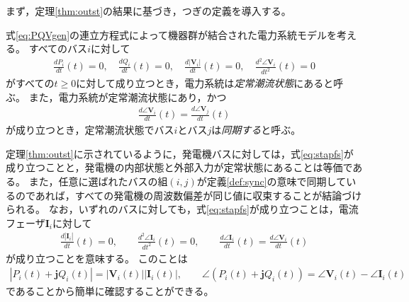 \documentclass[tombow,dvipdfmx]{corona-a5-1.1}
\begin{document}
まず，定理\ref{thm:outst}の結果に基づき，つぎの定義を導入する。

\begin{定義}[定常潮流状態とバス電圧の同期]
\label{def:sync}
式\ref{eq:PQVgen}の連立方程式によって機器群が結合された電力系統モデルを考える。
すべてのバス$i$に対して
\begin{align}\label{eq:stapfs}
\frac{dP_i}{dt}(t)=0
,\quad
\frac{dQ_i}{dt}(t)=0
,\quad
\frac{d|\bm{V}_i|}{dt}(t)=0
,\quad
\frac{d^2 \angle \bm{V}_i }{dt^2}(t)=0
\end{align}
がすべての$t\geq0$に対して成り立つとき，電力系統は\emph{定常潮流状態}にあると呼ぶ。
また，電力系統が定常潮流状態にあり，かつ
\begin{align}\label{eq:defsyn}
\frac{d \angle \bm{V}_i}{dt}(t) =  \frac{d \angle \bm{V}_j}{dt}(t)
\end{align}
が成り立つとき，定常潮流状態でバス$i$とバス$j$は\emph{同期する}と呼ぶ。
\end{定義}

定理\ref{thm:outst}に示されているように，発電機バスに対しては，式\ref{eq:stapfs}が成り立つことと，発電機の内部状態と外部入力が定常状態にあることは等価である。
また，任意に選ばれたバスの組$(i,j)$が定義\ref{def:sync}の意味で同期しているのであれば，すべての発電機の周波数偏差が同じ値に収束することが結論づけられる。
なお，いずれのバスに対しても，式\ref{eq:stapfs}が成り立つことは，電流フェーザ$\bm{I}_i$に対して
\begin{align*}
\frac{d|\bm{I}_i|}{dt}(t)=0
,\qquad
\frac{d^2 \angle \bm{I}_i }{dt^2}(t)=0
,\qquad
\frac{d \angle \bm{I}_i }{dt}(t) = \frac{d \angle \bm{V}_i }{dt} (t)
\end{align*}
が成り立つことを意味する。
このことは
\begin{align*}
|P_i(t) + \bm{j} Q_i(t)| = |\bm{V}_i(t)| |\bm{I}_i(t)|
,\qquad
\angle(P_i(t) + \bm{j} Q_i(t)) = \angle \bm{V}_i(t) - \angle \bm{I}_i(t)
\end{align*}
であることから簡単に確認することができる。
\end{document}
